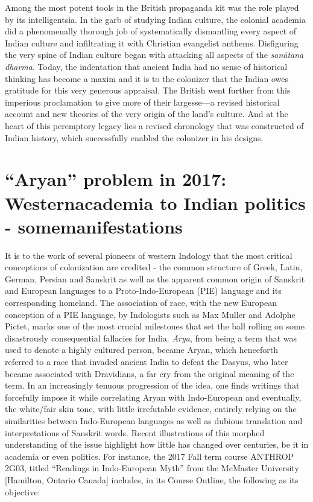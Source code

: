 Among the most potent tools in the British propaganda kit was the role played by its intelligentsia. In the garb of studying Indian culture, the colonial academia did a phenomenally thorough job of systematically dismantling every aspect of Indian culture and infiltrating it with Christian evangelist anthems. Disfiguring the very spine of Indian culture began with attacking all aspects of the \textit{sanātana dharma}. Today, the indentation that ancient India had no sense of historical thinking has become a maxim and it is to the colonizer that the Indian owes gratitude for this very generous appraisal. The British went further from this imperious proclamation to give more of their largesse—a revised historical account and new theories of the very origin of the land’s culture. And at the heart of this peremptory legacy lies a revised chronology that was constructed of Indian history, which successfully enabled the colonizer in his designs.


\section{“Aryan” problem in 2017: Western\hfill \break academia to Indian politics - some\hfill \break manifestations}

It is to the work of several pioneers of western Indology that the most critical conceptions of colonization are credited - the common structure of Greek, Latin, German, Persian and Sanskrit as well as the apparent common origin of Sanskrit and European languages to a Proto-Indo-European (PIE) language and its corresponding homeland. The association of race, with the new European conception of a PIE language, by Indologists such as Max Muller and Adolphe Pictet, marks one of the most crucial milestones that set the ball rolling on some disastrously consequential fallacies for India. \textit{Ārya}, from being a term that was used to denote a highly cultured person, became Aryan, which henceforth referred to a race that invaded ancient India to defeat the Dasyus, who later became associated with Dravidians, a far cry from the original meaning of the term. In an increasingly tenuous progression of the idea, one finds writings that forcefully impose it while correlating Aryan with Indo-European and eventually, the white/fair skin tone, with little irrefutable evidence, entirely relying on the similarities between Indo-European languages as well as dubious translation and interpretations of Sanskrit words. Recent illustrations of this morphed understanding of the issue highlight how little has changed over centuries, be it in academia or even politics. For instance, the 2017 Fall term course ANTHROP 2G03, titled “Readings in Indo-European Myth” from the McMaster University [Hamilton, Ontario Canada] includes, in its Course Outline, the following as its objective:

